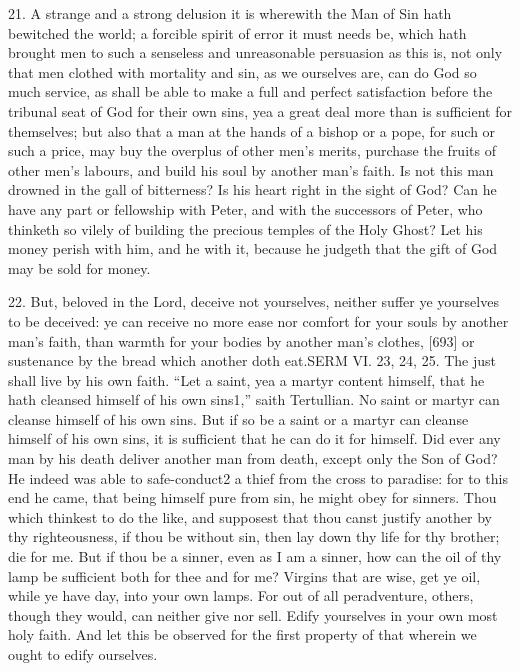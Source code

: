 21. A strange and a strong delusion it is wherewith the Man of Sin hath bewitched the world; a forcible spirit of error it must needs be, which hath brought men to such a senseless and unreasonable persuasion as this is, not only that men clothed with mortality and sin, as we ourselves are, can do God so much service, as shall be able to make a full and perfect satisfaction before the tribunal seat of God for their own sins, yea a great deal more than is sufficient for themselves; but also that a man at the hands of a bishop or a pope, for such or such a price, may buy the overplus of other men’s merits, purchase the fruits of other men’s labours, and build his soul by another man’s faith. Is not this man drowned in the gall of bitterness? Is his heart right in the sight of God? Can he have any part or fellowship with Peter, and with the successors of Peter, who thinketh so vilely of building the precious temples of the Holy Ghost? Let his money perish with him, and he with it, because he judgeth that the gift of God may be sold for money.

22. But, beloved in the Lord, deceive not yourselves, neither suffer ye yourselves to be deceived: ye can receive no more ease nor comfort for your souls by another man’s faith, than warmth for your bodies by another man’s clothes, [693] or sustenance by the bread which another doth eat.SERM VI. 23, 24, 25. The just shall live by his own faith. “Let a saint, yea a martyr content himself, that he hath cleansed himself of his own sins1,” saith Tertullian. No saint or martyr can cleanse himself of his own sins. But if so be a saint or a martyr can cleanse himself of his own sins, it is sufficient that he can do it for himself. Did ever any man by his death deliver another man from death, except only the Son of God? He indeed was able to safe-conduct2 a thief from the cross to paradise: for to this end he came, that being himself pure from sin, he might obey for sinners. Thou which thinkest to do the like, and supposest that thou canst justify another by thy righteousness, if thou be without sin, then lay down thy life for thy brother; die for me. But if thou be a sinner, even as I am a sinner, how can the oil of thy lamp be sufficient both for thee and for me? Virgins that are wise, get ye oil, while ye have day, into your own lamps. For out of all peradventure, others, though they would, can neither give nor sell. Edify yourselves in your own most holy faith. And let this be observed for the first property of that wherein we ought to edify ourselves.

